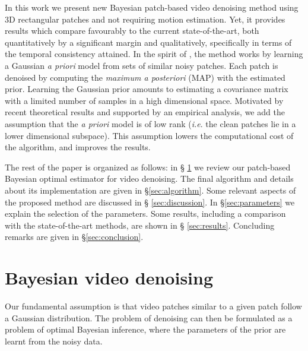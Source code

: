 \documentclass[10pt, a4paper]{article}
\newcommand{\ie}{\emph{i.e}. } \newcommand{\Ie}{\emph{I.e}. }
\begin{document}
\bigskip

In this work we present new Bayesian patch-based video denoising method using
3D rectangular patches and not requiring motion estimation.
Yet, it provides
results which compare favourably to the current state-of-the-art,
both quantitatively by a significant margin and qualitatively, specifically in
terms of the temporal consistency attained.
In the spirit of  \cite{Lebrun2013a,Lebrun2013ipol},
the method works by learning a Gaussian \emph{a priori} model from sets of 
similar noisy patches. Each patch is denoised by computing the \emph{maximum a
posteriori} (MAP) with the estimated prior.
Learning the Gaussian prior amounts to estimating a covariance matrix with a
limited number of samples in a high dimensional space. Motivated by recent 
theoretical results and supported by an empirical analysis, we add the 
assumption that the \emph{a priori} model is of low rank (\ie the clean patches
lie in a lower dimensional subspace). This assumption lowers the computational cost
of the algorithm, and improves the results.



\bigskip

The rest of the paper is organized as follows: in \S
\ref{sec:review_nonlocal_Bayes} we review our patch-based Bayesian optimal estimator for
video denoising. The final algorithm and details about its implementation are
given in \S \ref{sec:algorithm}.
Some relevant aspects of the proposed method are discussed in \S
\ref{sec:discussion}.
In \S \ref{sec:parameters}
we explain the selection of the parameters. Some results, including a
comparison with the state-of-the-art methods, are shown in \S
\ref{sec:results}. Concluding remarks are given in \S \ref{sec:conclusion}.

\section{Bayesian video denoising}
\label{sec:review_nonlocal_Bayes}

Our fundamental assumption is that video patches similar to a given
patch follow a Gaussian distribution.
The problem 
of denoising can then be formulated as a problem of optimal Bayesian inference, where the
parameters of the prior are learnt from the noisy data.
\end{document}
